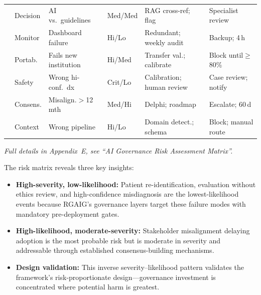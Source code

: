 \begin{table}[!htbp]
\begin{tabularx}{\textwidth}{@{} p{0.4cm} >{\raggedright\arraybackslash}p{1.8cm} L >{\raggedright\arraybackslash}p{1.3cm} L L @{}}
 & Decision & AI vs.\ guidelines & Med/Med & RAG cross-ref; flag & Specialist review \\
 & Monitor & Dashboard failure & Hi/Lo & Redundant; weekly audit & Backup; 4\,h \\
 & Portab. & Fails new institution & Hi/Med & Transfer val.; calibrate & Block until$\geq$80\% \\
 & Safety & Wrong hi-conf.\ dx & Crit/Lo & Calibration; human review & Case review; notify \\
 & Consens. & Misalign.$>$12\,mth & Med/Hi & Delphi; roadmap & Escalate; 60\,d \\
 & Context & Wrong pipeline & Hi/Lo & Domain detect.; schema & Block; manual route \\
\bottomrule
\end{tabularx}
\end{table}
\fi
\noindent\textit{Full details in Appendix~E, see ``AI Governance Risk Assessment Matrix''.}


The risk matrix reveals three key insights:

\begin{itemize}
    \item \textbf{High-severity, low-likelihood:} Patient re-identification, evaluation without ethics review, and high-confidence misdiagnosis are the lowest-likelihood events because RGAIG's governance layers target these failure modes with mandatory pre-deployment gates.
    \item \textbf{High-likelihood, moderate-severity:} Stakeholder misalignment delaying adoption is the most probable risk but is moderate in severity and addressable through established consensus-building mechanisms.
    \item \textbf{Design validation:} This inverse severity--likelihood pattern validates the framework's risk-proportionate design---governance investment is concentrated where potential harm is greatest.
\end{itemize}

